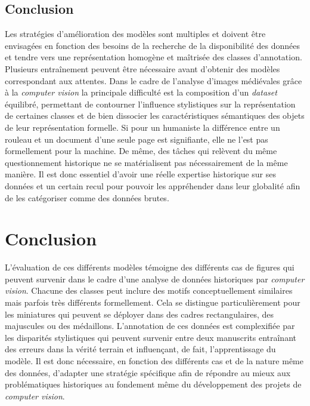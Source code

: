 \documentclass[12pt,twoside]{book}
\begin{document}
\section*{Conclusion}

Les stratégies d’amélioration des modèles sont multiples et doivent être envisagées en fonction des besoins de la recherche de la disponibilité des données et tendre vers une représentation homogène et maîtrisée des classes d'annotation. Plusieurs entraînement peuvent être nécessaire avant d’obtenir des modèles correspondant aux attentes. Dans le cadre de l’analyse d’images médiévales grâce à la \textit{computer vision} la principale difficulté est la composition d’un \textit{dataset} équilibré, permettant de contourner l’influence stylistiques sur la représentation de certaines classes et de bien dissocier les caractéristiques sémantiques des objets de leur représentation formelle. Si pour un humaniste la différence entre un rouleau et un document d’une seule page est signifiante, elle ne l’est pas formellement pour la machine. De même, des tâches qui relèvent du même questionnement historique ne se matérialisent pas nécessairement de la même manière. Il est donc essentiel d’avoir une réelle expertise historique sur ses données et un certain recul pour pouvoir les appréhender dans leur globalité afin de les catégoriser comme des données brutes.

\chapter{Conclusion}

L’évaluation de ces différents modèles témoigne des différents cas de figures qui peuvent survenir dans le cadre d’une analyse de données historiques par \textit{computer vision}. Chacune des classes peut inclure des motifs conceptuellement similaires mais parfois très différents formellement. Cela se distingue particulièrement pour les miniatures qui peuvent se déployer dans des cadres rectangulaires, des majuscules ou des médaillons. L’annotation de ces données est complexifiée par les disparités stylistiques qui peuvent survenir entre deux manuscrits entraînant des erreurs dans la vérité terrain et influençant, de fait, l’apprentissage du modèle. Il est donc nécessaire, en fonction des différents cas et de la nature même des données, d’adapter une stratégie spécifique afin de répondre au mieux aux problématiques historiques au fondement même du développement des projets de \textit{computer vision}. \\
\end{document}
